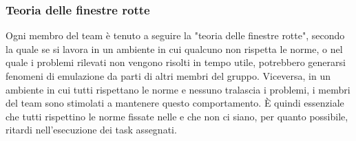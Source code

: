 \subsubsection{Teoria delle finestre rotte}
Ogni membro del team è tenuto a seguire la "teoria delle finestre rotte", secondo la quale se si lavora in un ambiente in cui qualcuno non rispetta le norme, o nel quale i problemi rilevati non vengono risolti in tempo utile, potrebbero generarsi fenomeni di emulazione da parti di altri membri del gruppo. Viceversa, in un ambiente in cui tutti rispettano le norme e nessuno tralascia i problemi, i membri del team sono stimolati a mantenere questo comportamento. È quindi essenziale che tutti rispettino le norme fissate nelle \NormeDiProgetto{} e che non ci siano, per quanto possibile, ritardi nell'esecuzione dei task assegnati.